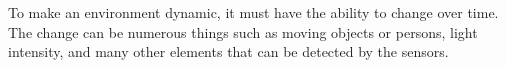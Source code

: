 To make an environment dynamic, it must have the ability to change over time. The change can be numerous things such as moving objects or persons, light intensity, and many other elements that can be detected by the sensors.